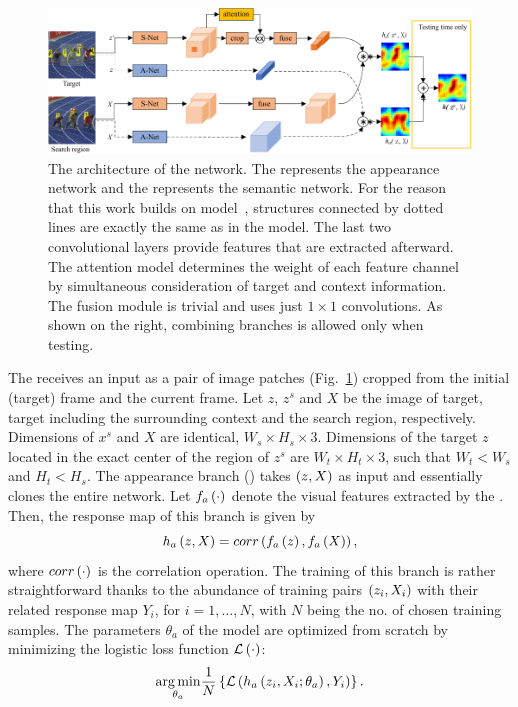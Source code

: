 \begin{figure}[t]
    \centerline{\includegraphics[width=\linewidth]{figures/theoretical_foundations/twofold_siamese_net_architecture.pdf}}
    \caption[ architecture]{The architecture of the  network. The  represents the appearance network and the  represents the semantic network. For the reason that this work builds on  model~\cite{bertinetto2016siamfc}, structures connected by dotted lines are exactly the same as in the  model. The last two convolutional layers provide features that are extracted afterward. The attention model determines the weight of each feature channel by simultaneous consideration of target and context information. The fusion module is trivial and uses just $1 \times 1$ convolutions. As shown on the right, combining branches is allowed only when testing. }
    \label{fig:TwofoldSiameseNetArchitecture}
\end{figure}

The  receives an input as a pair of image patches (Fig.~\ref{fig:TwofoldSiameseNetArchitecture}) cropped from the initial (target) frame and the current frame. Let $z$, $z^s$ and $X$ be the image of target, target including the surrounding context and the search region, respectively. Dimensions of $x^s$ and $X$ are identical, $W_s \times H_s \times 3$. Dimensions of the target $z$ located in the exact center of the region of $z^s$ are $W_t \times H_t \times 3$, such that $W_t < W_s$ and $H_t < H_s$. The appearance branch () takes $\left( {z, X} \right)$ as input and essentially clones the entire  network. Let ${f_a} \left( \cdot \right)$ denote the visual features extracted by the . Then, the response map of this branch is given by
\begin{equation}
    {h_a} \left( z, X \right) = {corr} \left( {f_a} \left( z \right), {f_a} \left( X \right) \right),
\end{equation}
where ${corr} \left( \cdot \right)$ is the correlation operation. The training of this branch is rather straightforward thanks to the abundance of training pairs $\left( {z_i, X_i} \right)$ with their related response map $Y_i$, for $i = 1, \dots, N$, with $N$ being the no. of chosen training samples. The parameters $\theta_a$ of the  model are optimized from scratch by minimizing the logistic loss function ${\mathcal{L}} \left( \cdot \right)$:
\begin{equation}
    \label{eq:ANetModelTraining}
    \underset{\theta_a}{\operatorname*{arg\,min}}
    \frac{1}{N}
    \left\{ {
        {\mathcal{L}} \left( 
            {h_a} \left( z_i, X_i; \theta_a \right),
            Y_i
         \right)
    } \right\}.
\end{equation}

